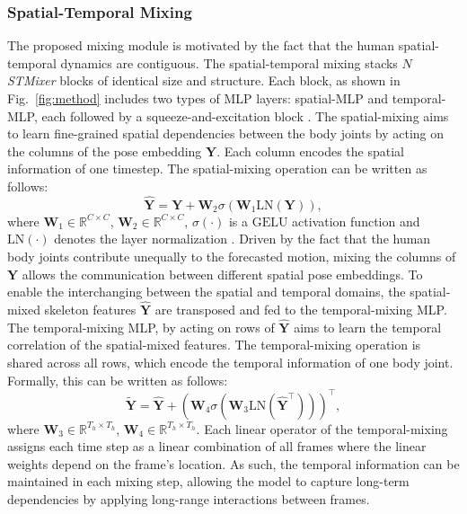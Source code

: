 \documentclass{article}
\begin{document}
\subsubsection{Spatial-Temporal Mixing}
 The proposed mixing module is motivated by the fact that the human spatial-temporal dynamics are contiguous. The spatial-temporal mixing stacks $N$ \textit{STMixer} blocks of identical size and structure. Each block, as shown in Fig.~\ref{fig:method} includes two types of MLP layers: spatial-MLP and temporal-MLP, each followed by a squeeze-and-excitation block \cite{hu2018squeeze}. The spatial-mixing aims to learn fine-grained spatial dependencies between the body joints by acting on the columns of the pose embedding $\mathbf Y$. Each column encodes the spatial information of one timestep. The spatial-mixing operation can be written as follows:
\begin{equation}
\hat{\mathbf{Y}} = \mathbf{Y} + \mathbf{W}_2 \sigma(\mathbf{W}_1\text{LN}(\mathbf{Y})),
\end{equation}
 where $\mathbf{W}_1 \in \mathbb{R}^{C \times C}$, $\mathbf{W}_2 \in \mathbb{R}^{{C} \times C}$, $\sigma (\cdot)$ is a $\text{GELU}$ activation function \cite{hendrycks2016gaussian} and $\text{LN} (\cdot)$ denotes the layer normalization \cite{ba2016layer}.
 Driven by the fact that the human body joints contribute unequally to the forecasted motion, mixing the columns of $\mathbf Y$ allows the communication between different spatial pose embeddings. To enable the interchanging between the spatial and temporal domains, the spatial-mixed skeleton features $\hat{\mathbf{Y}}$ are transposed and fed to the temporal-mixing MLP. The temporal-mixing MLP, by acting on rows of $\hat{\mathbf{Y}}$ aims to learn the temporal correlation of the spatial-mixed features. The temporal-mixing operation is shared across all rows, which encode the temporal information of one body joint. Formally, this can be written as follows: 
  \begin{equation}
\widetilde{\mathbf{Y}} = \hat{\mathbf{Y}} + (\mathbf{W}_4 \sigma(\mathbf{W}_3\text{LN}(\hat{\mathbf{Y}}^\top)))^\top,
\end{equation}
 where $\mathbf{W}_3 \in \mathbb{R}^{T_h\times T_h}$, $\mathbf{W}_4 \in \mathbb{R}^{T_h\times T_h}$. Each linear operator of the temporal-mixing assigns each time step as a linear combination of all frames where the linear weights depend on the frame’s location.  As such, the temporal information can be maintained in each mixing step, allowing the model to capture long-term dependencies by applying long-range interactions between frames.
\end{document}
